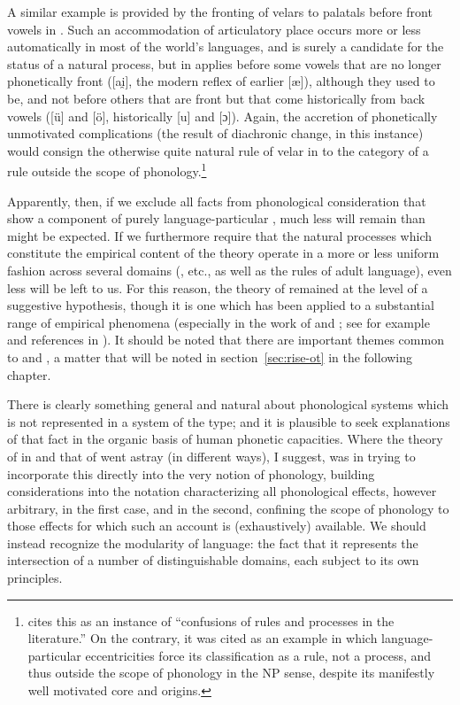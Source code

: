 A similar example is provided by the fronting of velars to palatals
before front vowels in 
\citep[100ff.]{arnason11:icel.far.phonology}. Such an accommodation of
articulatory place occurs more or less automatically in most of the
world's languages, and is surely a candidate for the status of a
natural process, but in  applies before some vowels that are
no longer phonetically front ([ai̯], the modern reflex of earlier [æ]),
although they used to be, and not before others that are front but
that come historically from back vowels ([ü] and [ö], historically [u]
and [ɔ]). Again, the accretion of phonetically unmotivated
complications (the result of diachronic change, in this instance)
would consign the otherwise quite natural rule of velar 
in  to the category of a rule outside the scope of
phonology.\footnote{\citet[48]{dressler84:explaining.np} cites this as
  an instance of ``confusions of rules and processes in the
  literature.'' On the contrary, it was cited as an example in which
  language-particular eccentricities force its classification as a
  rule, not a process, and thus outside the scope of phonology in the
  NP sense, despite its manifestly well motivated core and origins.}

Apparently, then, if we exclude all facts from phonological
consideration that show a component of purely language-particular
, much less will remain than might be expected. If we
furthermore require that the natural processes which constitute the
empirical content of the theory operate in a more or less uniform
fashion across several domains (, etc., as well as the
rules of adult language), even less will be left to us. For this
reason, the theory of  remained at the level of a
suggestive hypothesis, though it is one which has been applied to a
substantial range of empirical phenomena (especially in the work of
{\Stampe} and {\Donegan}; see for example \citealt{donegan78:vowels} and
references in \citealt{donegan.stampe09:hypotheses}). It should be
noted that there are important themes common to  and
, a matter that will be noted in
section~\ref{sec:rise-ot} in the following chapter.

There is clearly something general and natural about phonological
systems which is not represented in a system of the \textsl{} type;
and it is plausible to seek explanations of that fact in the organic
basis of human phonetic capacities. Where the theory of  in
\textsl{} and that of  went astray (in different
ways), I suggest, was in trying to incorporate this 
directly into the very notion of phonology, building 
considerations into the notation characterizing all phonological
effects, however arbitrary, in the first case, and in the second,
confining the scope of phonology to those effects for which such an
account is (exhaustively) available. We should instead recognize the
modularity of language: the fact that it represents the intersection
of a number of distinguishable domains, each subject to its own
principles.

